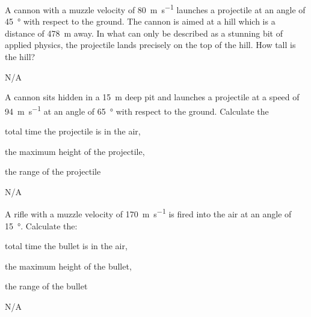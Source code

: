 \begin{question}[ID=upwardly-B-Q04,topic=projectiles,difficulty=B]
    A cannon with a muzzle velocity of \SI{80}{\meter\per\second}
        launches a projectile at an angle of \SI{45}{\degree}
        with respect to the ground.
    The cannon is aimed at a hill which is a distance of
        \SI{478}{\meter} away.
    In what can only be described as a stunning bit of applied
        physics, the projectile lands precisely on the top of
        the hill.
    How tall is the hill?
\end{question}
\begin{solution}
    N/A
\end{solution}


\begin{question}[ID=upwardly-B-Q05,topic=projectiles,difficulty=B]
    A cannon sits hidden in a \SI{15}{\meter} deep pit and
        launches a projectile at a speed of \SI{94}{\meter\per\second}
        at an angle of \SI{65}{\degree} with respect to the ground.
    Calculate the
    \begin{enumerate*}[label=\arabic*)]
        \item total time the projectile is in the air,
        \item the maximum height of the projectile,
        \item the range of the projectile
    \end{enumerate*}
\end{question}
\begin{solution}
    N/A
\end{solution}


\begin{question}[ID=upwardly-C-Q01,topic=projectiles,difficulty=C]
    A rifle with a muzzle velocity of \SI{170}{\meter\per\second}
        is fired into the air at an angle of \SI{15}{\degree}.
    Calculate the:
    \begin{enumerate*}[label=\arabic*)]
        \item total time the bullet is in the air,
        \item the maximum height of the bullet,
        \item the range of the bullet
    \end{enumerate*}
\end{question}
\begin{solution}
    N/A
\end{solution}



